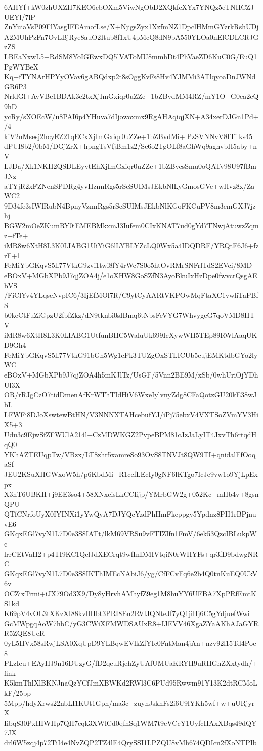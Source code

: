 6AHYf+kW0zhUXZH7KEO6cbOXm5ViwNgObD2XQkfeXYx7YNQz5eTNHCZJUEYl/7lP
ZnYuiaVsP09FlYasgIFEAmofLse/X+NjigsZyx1XzfmNZ1DpclHMmGYzrkRshUDj
A2MUhPzFn7OvLBjRye8auO2Itub8f1xU4pMcQ8dN9bA550YLOa0nElCDLCRJGzZS
LBEaNxwL5+RdSM8YoIGEwxDQ5lVAToMU8mmhDt4PhVaeZD6KuC0G/EuQ1PgWYBeX
Kq+fTYNArHPYyOVav6gABQdxp2t8sOggKvFs8Hv4YJMMi3ATlqyoaDnJWNdGR6P3
NrldGl+AvVBe1BDAk3e2txXjImGxiqr0uZZe+1bZBvdMM4RZ/mY1O+G0ea2cQ9hD
ycRy/sXOEcW/u8PAI6p4YHuva7dIjowoxmx9RgAHAqiqjXN+A34xerDJGn1Pd+/4
kiV2nMsesj2hcyEZ21qECxXjImGxiqr0uZZe+1bZBvdMi+lPzSVNNvV8ITilks45
dPUI8b2/0bM/DGjZrX+hpngTsVfjBm1z2/Se6o2TgOLf8aGhWq9aghvbH5aby+nV
LJDa/Xk1NKH2QSDLEyvtEhXjImGxiqr0uZZe+1bZBvcsSmu0oQATv98U97fBmJNz
aTYjR2xFZNenSPDRg4yvHznnRgs5rScSUIMsJEkbNlLyGmosGVe+wHvz8x/ZaWC2
9D34fe3sIWlRubN4BpnyVznnRgs5rScSUIMsJEkbNlKGoFKCuPV8m3emGXJ7jzhj
BGW2mOeZKumRY0iEMEBMkxmJ3Iufem0CIxKNAT7ud0gYd7TNwjAtuwzZqmz+fTe+
iMR8w6XtH8L3K0LIABG1UiYiG6lLYBLYZcLQ0Wx5a4IDQDRF/YRQtF6J6+fzrF+1
FeMiYbGKqvS5ll77VtkG9zvi1twi8fY4rWc7S0o5htOvRMrSNFrlTdS2EVci/8MD
eBOxV+MGbXPb9J7qjZOA4j/e1oXHW8GoSZfN3AyoBkuIxHzDpe0fwvcrQsgAEbVS
/FiClYv4YLqseNvpIC6/3IjEfMOl7R/C9ytCyAARtVKPOwMqFtaXC1vwliTaPBfS
b0keCtFuZiGpzU2fbfZkz/dN9tknbi0sIBmq6tNbsFeVYG7WhvygeG7qoVMD8HTV
iMR8w6XtH8L3K0LIABG1UtfunBHC5WaluUk699IcXywWH5TEp89RWlAaqUKD9Gh4
FeMiYbGKqvS5ll77VtkG91bGn5Wg1ePk3TUZgOxSTLICUb5cujEMKtdbGYo2lyWC
eBOxV+MGbXPb9J7qjZOA4h5mKJlTz/UsGF/5Vnn2BE9M/xSb/0whUriOjYDhUl3X
OR/rRJgCzO7tidDmenAfKrWThTIdHiV6WxeIylvnyZdg8CFaQotzGU20kE38wJbL
LFWFi8DJoXswtewBtHN/V3NNNXTAHcebufYJ/iPj75ebxV4VXTSoZVmYV3HiX5+3
Udu3c9EjwSfZFWUlA214l+CzMDWKGZ2PvpeBPM81cJzJaLyIT4JxvTh6rtqdHqQ0
YKhAZTEUqpTw/VBzx/LT8zhr5xamreSo93OvS8TNVJt8QW9TI+qnidalFfOoqaSf
JEU2KSuXHGWxoW5h/p6KbdMi+R1cefLEcIy0gNF6lKTgo7IcJe9vw1o9YjLpExpx
X3nT6UBKH+j9EE3so4+58XNxcisLkCCIijp/YMrbGW2g+052Kc+mHb4v+8gsnQPU
QTfCNrfoUyX0IYINXi1yYwQyA7DJYQcYzdPhHmFkeppgy5Ypdnz8PH1rBPjnuvE6
GKqxEGl7vyN1L7D0e3S8IATt/lkM69VRSu9vFTIZIfn1FmV/6ek53QzcIBLukpWc
lrrCEtVaH2+p4TI9KC1QclJdXECrqt9wfInDMIVtqiN0rWHYFs+qr3fD9bdwgNRC
GKqxEGl7vyN1L7D0e3S8IKThIMEcNAbiJ6/yg/CfFCvFq6e2b4Q0tnKuEQ0UkV6v
OCZixTrmi+iJX79Od3X9/Dy8yHrvhAMhyfZ9eg1M8huYY6UFBA7XpPRfEmtKS1kd
K69pV4vOL3tXKzXI88kvIlHbt3PRI8En2RVlJQNteJf7yQ1jiHj6C5gYdjuefWwi
GcMWpgqAoW7hbC/yG3CWiXFMWDSAUxR8+IJEVV46XgaZYaAKhAJaGYRR5ZQE8UeR
0yL5HVx58sRwjLSA0XqUpD9YLBqwEVlkZfYIc0FntMan4jAn+nzv92l15Td4Poc8
PLzIeu+EAyHJ9n16DUzyG/fD2qcuRjehZyUAfUMUaKRYH9uRHGhZXxtydh/+fink
K5kmThlXlBKNJnaQzYCfJmXBWKd2RWl3C6PUd95Rwwm91Y13K2dtRCMoLkF/25bp
5Mpp/hdyXrws22nbLI1KUt1Gph/ma3c+zuyhJskhFs2i6U9lYKh5wf+w+uURjyrX
Iibq830PxHIWHp7QH7cqk3XWlCd0qfnSq1WM7t9cVCcY1UyfcHAxXBqs49dQY7JX
drl6W5zqj4p72TiI4e4NvZQP2TZ4lE4QrySSI1LPZQU8vMh674QDIcn2fXoNTPIb
